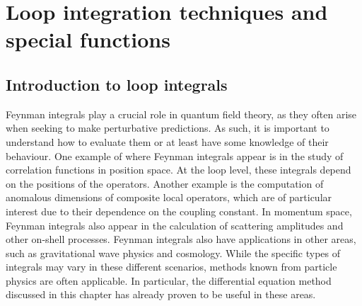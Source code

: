 \chapter{Loop integration techniques and special functions}
\label{ch:loopints}



\section{Introduction to loop integrals}
\label{sec:4.1}

Feynman integrals play a crucial role in quantum field theory, as they often arise when seeking to make perturbative predictions. As such, it is important to understand how to evaluate them or at least have some knowledge of their behaviour.
One example of where Feynman integrals appear is in the study of correlation functions in position space. At the loop level, these integrals depend on the positions of the operators. Another example is the computation of anomalous dimensions of composite local operators, which are of particular interest due to their dependence on the coupling constant.
In momentum space, Feynman integrals also appear in the calculation of scattering amplitudes and other on-shell processes.
Feynman integrals also have applications in other areas, such as gravitational wave physics and  cosmology. While the specific types of integrals may vary in these different scenarios, methods known from particle physics are often applicable. In particular, the differential equation method discussed in this chapter has already proven to be useful in these areas.


